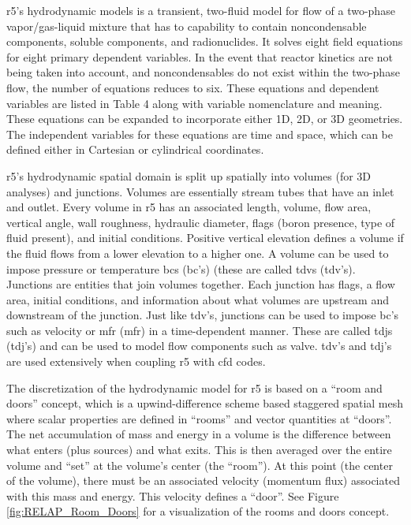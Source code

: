 \documentclass[double,12pt]{beavtex}
\begin{document}
\acrshort{r5}’s hydrodynamic models is a transient, two-fluid model for flow of a two-phase vapor/gas-liquid mixture that has to capability to contain noncondensable components, soluble components, and radionuclides. It solves eight field equations for eight primary dependent variables. In the event that reactor kinetics are not being taken into account, and noncondensables do not exist within the two-phase flow, the number of equations reduces to six. These equations and dependent variables are listed in Table 4 along with variable nomenclature and meaning. These equations can be expanded to incorporate either 1D, 2D, or 3D geometries. The independent variables for these equations are time and space, which can be defined either in Cartesian or cylindrical coordinates.

\acrshort{r5}’s hydrodynamic spatial domain is split up spatially into volumes (for 3D analyses) and junctions. Volumes are essentially stream tubes that have an inlet and outlet. Every volume in \acrshort{r5} has an associated length, volume, flow area, vertical angle, wall roughness, hydraulic diameter, flags (boron presence, type of fluid present), and initial conditions. Positive vertical elevation defines a volume if the fluid flows from a lower elevation to a higher one. A volume can be used to impose pressure or temperature \acrlong{bc}s (\acrshort{bc}'s) (these are called \acrlong{tdv}s (\acrshort{tdv}’s). Junctions are entities that join volumes together. Each junction has flags, a flow area, initial conditions, and information about what volumes are upstream and downstream of the junction. Just like \acrshort{tdv}’s, junctions can be used to impose \acrshort{bc}'s such as velocity or \acrlong{mfr} (\acrshort{mfr}) in a time-dependent manner. These are called \acrlong{tdj}s (\acrshort{tdj}’s) and can be used to model flow components such as valve. \acrshort{tdv}’s and \acrshort{tdj}’s are used extensively when coupling \acrshort{r5}  with \acrshort{cfd}  codes. 

The discretization of the hydrodynamic model for \acrshort{r5} is based on a “room and doors” concept, which is a upwind-difference scheme based staggered spatial mesh where scalar properties are defined in “rooms” and vector quantities at “doors”. The net accumulation of mass and energy in a volume is the difference between what enters (plus sources) and what exits. This is then averaged over the entire volume and “set” at the volume’s center (the “room”). At this point (the center of the volume), there must be an associated velocity (momentum flux) associated with this mass and energy. This velocity defines a “door”. See Figure \ref{fig:RELAP_Room_Doors} for a visualization of the rooms and doors concept.
\end{document}
